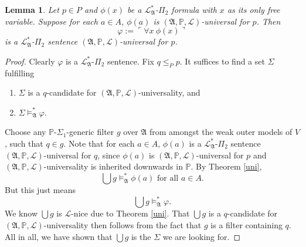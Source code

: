 \documentclass[12pt, twoside]{memoir}
\numberwithin{equation}{section}
\newtheorem{lem}[thm]{Lemma}
\theoremstyle{definition}
\theoremstyle{remark}
\theoremstyle{definition}
\theoremstyle{definition}
\theoremstyle{definition}
\theoremstyle{remark}
\begin{document}
\begin{lem}\label{univer}
Let $p \in P$ and $\phi(x)$ be a $\mathcal{L}^{*}_{\mathfrak{A}}$-$\Pi_2$ formula with $x$ as its only free variable. Suppose for each $a \in A$, $\phi(a)$ is $(\mathfrak{A}, \mathbb{P}, \mathcal{L})$-universal for $p$. Then
\begin{equation*}
    \varphi := \ulcorner \forall x \ \phi(x) \urcorner
\end{equation*}
is a $\mathcal{L}^{*}_{\mathfrak{A}}$-$\Pi_2$ sentence $(\mathfrak{A}, \mathbb{P}, \mathcal{L})$-universal for $p$.
\end{lem}
\begin{proof}
Clearly $\varphi$ is a $\mathcal{L}^{*}_{\mathfrak{A}}$-$\Pi_2$ sentence. Fix $q \leq_P p$. It suffices to find a set $\Sigma$ fulfilling
\begin{enumerate}[label=(\alph*)]
    \item $\Sigma$ is a $q$-candidate for $(\mathfrak{A}, \mathbb{P}, \mathcal{L})$-universality, and 
    \item $\Sigma \models^{*}_{\mathfrak{A}} \varphi$.
\end{enumerate}

Choose any $\mathbb{P}$-$\Sigma_1$-generic filter $g$ over $\mathfrak{A}$ from amongst the weak outer models of $V$, such that $q \in g$. Note that for each $a \in A$, $\phi(a)$ is a $\mathcal{L}^{*}_{\mathfrak{A}}$-$\Pi_2$ sentence $(\mathfrak{A}, \mathbb{P}, \mathcal{L})$-universal for $q$, since $\phi(a)$ is $(\mathfrak{A}, \mathbb{P}, \mathcal{L})$-universal for $p$ and $(\mathfrak{A}, \mathbb{P}, \mathcal{L})$-universality is inherited downwards in $\mathbb{P}$. By Theorem \ref{uni},
\begin{equation*}
    \bigcup g \models^{*}_{\mathfrak{A}} \phi(a) \text{ for all } a \in A \text{.}
\end{equation*}
But this just means 
\begin{equation*}
    \bigcup g \models^{*}_{\mathfrak{A}} \varphi \text{.}
\end{equation*}
We know $\bigcup g$ is $\mathcal{L}$-nice due to Theorem \ref{uni}. That $\bigcup g$ is a $q$-candidate for $(\mathfrak{A}, \mathbb{P}, \mathcal{L})$-universality then follows from the fact that $g$ is a filter containing $q$. All in all, we have shown that $\bigcup g$ is the $\Sigma$ we are looking for.
\end{proof}
\end{document}
